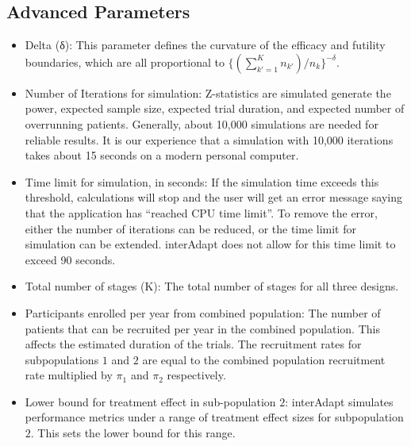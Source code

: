 \documentclass{article}
\newcommand{\interAdapt}{\textsf{interAdapt }}
\begin{document}
\subsection*{Advanced Parameters}

\begin{itemize}

\item Delta (δ): This parameter defines the curvature of the efficacy and futility boundaries, which are all proportional to $\{(\sum_{k'=1}^{K} n_{k'})/n_k\}^{-δ}$.

\item Number of Iterations for simulation: Z-statistics are simulated generate the power, expected sample size, expected trial duration, and expected number of overrunning patients. Generally, about 10,000 simulations are needed for reliable results. It is our experience that a simulation with 10,000 iterations takes about 15 seconds on a modern personal computer.

\item Time limit for simulation, in seconds: If the simulation time exceeds this threshold, calculations will stop and the user will get an error message saying that the application has “reached CPU time limit”. To remove the error, either the number of iterations can be reduced, or the time limit for simulation can be extended. \interAdapt does not allow for this time limit to exceed 90 seconds.

\item Total number of stages (K): The total number of stages for all three designs. 

\item Participants enrolled per year from combined population: The number of patients that can be recruited per year in the combined population. This affects the estimated duration of the trials. The recruitment rates for  subpopulations $1$ and $2$ are equal to the combined population recruitment rate multiplied by $π_1$ and $π_2$ respectively. %


\item Lower bound for treatment effect in sub-population $2$: \interAdapt simulates performance metrics under a range of treatment effect sizes for subpopulation $2$. This sets the lower bound for this range.


\end{itemize}
\end{document}
